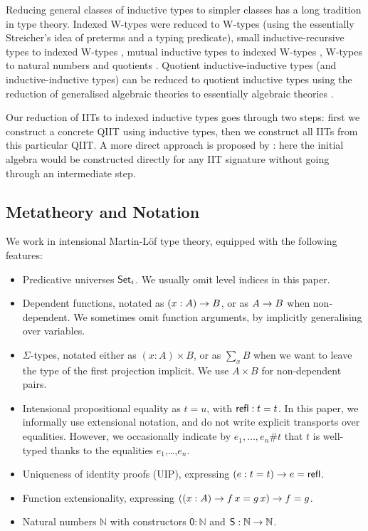 \documentclass[a4paper,UKenglish,cleveref, autoref]{lipics-v2019}
\begin{document}
Reducing general classes of inductive types to simpler classes has a
long tradition in type theory. Indexed W-types were reduced to W-types
\cite{indexedcont} (using the essentially Streicher's idea of preterms
and a typing predicate), small inductive-recursive types to indexed
W-types \cite{malatasta13smallir}, mutual inductive types to indexed
W-types \cite{mutual}, W-types to natural numbers and quotients
\cite{Ahrens2019}. Quotient inductive-inductive types (and
inductive-inductive types) can be reduced to quotient inductive types
using the reduction of generalised algebraic theories to essentially
algebraic theories \cite{gat}.

Our reduction of IITs to indexed inductive types goes through two
steps: first we construct a concrete QIIT using inductive types, then
we construct all IITs from this particular QIIT. A more direct
approach is proposed by \cite{erasure}: here the initial algebra would
be constructed directly for any IIT signature without going through an
intermediate step.

\subsection{Metatheory and Notation}

We work in intensional Martin-Löf type theory, equipped with the following features:
\begin{itemize}
  \item Predicative universes $\mathsf{Set}_i$. We usually omit level indices in this paper.
  \item Dependent functions, notated as $(x : A)\rightarrow B$, or as $A \rightarrow B$ when
    non-dependent. We sometimes omit function arguments, by implicitly
    generalising over variables.
  \item $\Sigma$-types, notated either as $(x : A)\times B$, or as $\sum\limits_{x} B$
        when we want to leave the type of the first projection implicit. We use $A
        \times B$ for non-dependent pairs.
  \item Intensional propositional equality as $t = u$, with $\mathsf{refl} : t = t$. In
    this paper, we informally use extensional notation, and do not write
    explicit transports over equalities. However, we occasionally indicate by
    $e_1,\dots,e_n \#t$ that $t$ is well-typed thanks to the equalities
    $e_1$,\dots,$e_n$.
  \item Uniqueness of identity proofs (UIP), expressing $(e : t = t)\rightarrow e = \mathsf{refl}$.
  \item Function extensionality, expressing $((x : A) \rightarrow f\,x = g\,x) \rightarrow f = g$.
  \item Natural numbers $\mathbb{N}$ with constructors $\mathsf{0}:\mathbb{N}$ and $\mathsf{S}:\mathbb{N}\rightarrow\mathbb{N}$.

\end{itemize}
\end{document}
